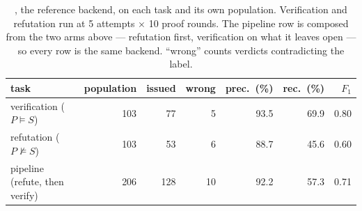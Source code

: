 \begin{table}[t]\centering\small
\caption{\daf{}, the reference backend, on each task and its own population. Verification and refutation run at 5 attempts $\times$ 10 proof rounds. The pipeline row is composed from the two arms above --- refutation first, verification on what it leaves open --- so every row is the same backend. ``wrong'' counts verdicts contradicting the label.}
\label{tab:tasks}
\begin{tabular}{lrrrrrr}
\toprule
task & population & issued & wrong & prec.\ (\%) & rec.\ (\%) & $F_1$\\
\midrule
verification ($P \models S$) & 103 & 77 & 5 & 93.5 & 69.9 & 0.80\\
refutation ($P \not\models S$) & 103 & 53 & 6 & 88.7 & 45.6 & 0.60\\
\midrule
pipeline (refute, then verify) & 206 & 128 & 10 & 92.2 & 57.3 & 0.71\\
\bottomrule
\end{tabular}
\end{table}
